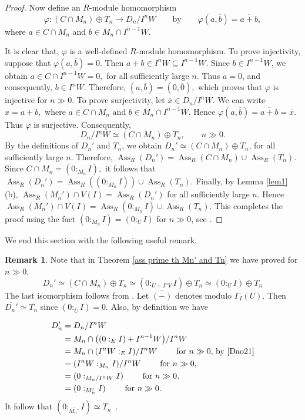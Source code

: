 \documentclass[11pt,reqno]{amsart}
\theoremstyle{definition}
\newtheorem{remark}[theorem]{Remark}
\newcommand{\Ass}{\operatorname{Ass}}
\begin{document}
\begin{proof}
Now define an $R$-module homomorphism
$$\varphi:(C\cap M_n)\oplus T_n
\longrightarrow {D_n}/{I^nW} \qquad \text{by} \qquad
\varphi(a,\overline{b})=\overline{a+b},$$
where $a\in C\cap M_n$ and
$b\in M_n\cap I^{n-1}W$.

It is clear that, $\varphi$ is a well-defined
$R$-module homomorphism. To prove injectivity, suppose that
$\varphi(a,\overline{b})=0.$
Then $a+b\in I^nW \subseteq I^{n-1}W.$
Since $b\in I^{n-1}W$, we obtain
$a\in C\cap I^{n-1}W=0,$ for all sufficiently large $n$.
Thus $a=0$, and consequently,
$b\in I^nW$. Therefore,
$(a,\overline{b})=(0,\overline{0}),$ which proves that $\varphi$ is injective for $n\gg 0$. To prove surjectivity, let
$\overline{x}\in D_n/I^nW$. We can write
$x=a+b,$ where
$a\in C\cap M_n
\text{ and }
b\in M_n\cap I^{n-1}W.$
Hence
$\varphi(a,\overline{b}) =\overline{a+b} =\overline{x}.$
Thus $\varphi$ is surjective.
Consequently, $${D_n}/{I^nW} \simeq (C\cap M_n)\oplus T_n, \qquad  n\gg 0 .$$
By the definitions of $D_n'$ and $T_n$,
we obtain
$D_n'\simeq (C\cap M_n)\oplus T_n$, for all sufficiently large $n$.
Therefore,
$\Ass_R(D_n') = \Ass_R(C\cap M_n)\cup\Ass_R(T_n).$
Since $C\cap M_n=(0:_{M_n}I),$ it follows that
$\Ass_R(D_n') = \Ass_R((0:_{M_n}I))\cup\Ass_R(T_n).$
Finally, by Lemma \ref{lem1}(b), $\Ass_R(M_n')\cap V(I)=\Ass_R(D_n')$ for all sufficiently large $n$.
Hence
$\Ass_R(M_n')\cap V(I)
=
\Ass_R(0:_{M_n}I)\cup\Ass_R(T_n).
$
This completes the proof using the fact $(0:_{M_n}I)=(0:_UI)$ for $n\gg 0$, see \cite[Lemma 3.7]{GP25}.
\end{proof}

We end this section with the following useful remark.

\begin{remark}\label{rmk1}
Note that in Theorem \ref{ass prime th Mn' and Tn} we have proved for $n\gg 0,$
$$D_n'\simeq (C\cap M_n)\oplus T_n\simeq (0:_{U+I^nV}I)\oplus T_n\simeq (0:_{U}I)\oplus T_n$$
The last isomorphism follows from \cite[Lemma 3.7]{GP25}. Let $\overline{(-)}$ denotes modulo $\Gamma_I(U)$. Then $\overline{D_n'}\simeq\overline{T_n}$ since $(0:_{\overline{U}}I)=0$. Also, by definition we have 

\begin{align*}
D_n'
&= {D_n}/{I^nW} 
\\ &= {M_n \cap \big((0 :_E I) + I^{n-1}W\big)}/{I^nW} 
\\ &= {M_n \cap (I^nW :_E I)}/{I^nW}
\qquad \text{ for $n\gg 0$, by \cite[Corollary 2.1]{Dao21}}
\\ &= {(I^nW :_{M_n} I)}/{I^nW}
\qquad \text{ for $n\gg 0$},
\\ &= (0 :_{M_n/I^nW} I)
\qquad \text{ for $n\gg 0$},
\\ &= (0 :_{M_n'} I) 
\qquad \text{ for $n\gg 0$}.
\end{align*}
It follow that $(0 :_{\overline{M_n'}} I)\simeq\overline{T_n} \, $ .
\end{remark}
\end{document}
